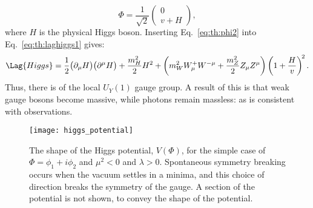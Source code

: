 \begin{equation}
  \Phi = \frac{1}{\sqrt{2}}
  \begin{pmatrix} 0 \\ v+H
  \end{pmatrix},
  \label{eq:th:phi2}
\end{equation}
where $H$ is the physical Higgs boson.
Inserting Eq.~\ref{eq:th:phi2} into Eq.~\ref{eq:th:laghiggs1} gives:
\begin{equation}
  \Lag{Higgs} =
  \frac{1}{2}\big(\partial_\mu H\big)\big(\partial^\mu H\big)
  +\frac{m_H^2}{2}H^2
  +\left(m_W^2W_\mu^+W^{-\mu} + \frac{m_Z^2}{2}Z_\mu Z^\mu\right)
  \left(1 + \frac{H}{v}\right)^{\!2}.
  \label{eq:th:laghiggs2}
\end{equation}
Thus, there is \SSB of the local $U_Y(1)$ gauge group.
A result of this is that weak gauge bosons become massive, while photons remain massless: as is
consistent with observations.

\begin{figure}
  \begin{center}
    \texttt{[image: higgs\_potential]}
    \caption[Shape of the Higgs potential]
    {
      The shape of the Higgs potential, $V(\Phi)$, for the simple case of $\Phi=\phi_1+i\phi_2$ and
      $\mu^2<0$ and $\lambda>0$.
      Spontaneous symmetry breaking occurs when the vacuum settles in a minima, and this choice of
      direction breaks the symmetry of the gauge.
      A section of the potential is not shown, to convey the shape of the potential.
    }
    \label{fig:th:higgspot}
  \end{center}
\end{figure}


